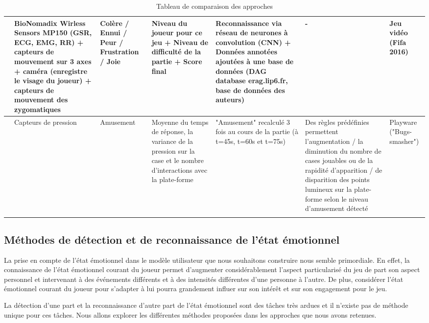 \documentclass{article}
\begin{document}
\begin{center}
\begin{longtable}{| p{0.8cm} | p{2cm} | p{2.5cm} | p{2.8cm} | p{3cm} | p{3.2cm} | p{1.5cm} |}
        \hline
        \cite{yang_et_al._2018} & BioNomadix Wirless Sensors MP150 (GSR, ECG, EMG, RR) + capteurs de mouvement sur 3 axes + caméra (enregistre le visage du joueur) + capteurs de mouvement des zygomatiques & Colère / Ennui / Peur / Frustration / Joie & Niveau du joueur pour ce jeu + Niveau de difficulté de la partie + Score final & Reconnaissance via réseau de neurones à convolution (CNN) + Données annotées ajoutées à une base de données (DAG database erag.lip6.fr, base de données des auteurs) & - & Jeu vidéo (Fifa 2016)\\
        \hline
        \cite{yannakakis_et_al._2009} & Capteurs de pression & Amusement & Moyenne du temps de réponse, la variance de la pression sur la case et le nombre d'interactions avec la plate-forme & "Amusement" recalculé 3 fois au cours de la partie (à t=45s, t=60s et t=75s) & Des règles prédéfinies permettent l'augmentation / la diminution du nombre de cases jouables ou de la rapidité d'apparition / de disparition des points lumineux sur la plate-forme selon le niveau d'amusement détecté & Playware ("Bugs-smasher")\\
        \hline
        \caption{Tableau de comparaison des approches}
        \label{tab:comparatif}
    \end{longtable}\end{center}
    \medskip
    \subsection{Méthodes de détection et de reconnaissance de l'état émotionnel}
    \label{sec:etatemotionnel}
        La prise en compte de l'état émotionnel dans le modèle utilisateur que nous souhaitons construire nous semble primordiale. 
        En effet, la connaissance de l'état émotionnel courant du joueur permet d'augmenter considérablement l'aspect particularisé du jeu de part son aspect personnel et intervenant à des événements différents et à des intensités différentes d'une personne à l'autre. 
        De plus, considérer l'état émotionnel courant du joueur pour s'adapter à lui pourra grandement influer sur son intérêt et sur son engagement pour le jeu.\par
        La détection d'une part et la reconnaissance d'autre part de l'état émotionnel sont des tâches très ardues et il n'existe pas de méthode unique pour ces tâches. Nous allons explorer les différentes méthodes proposées dans les approches que nous avons retenues.
\end{document}
